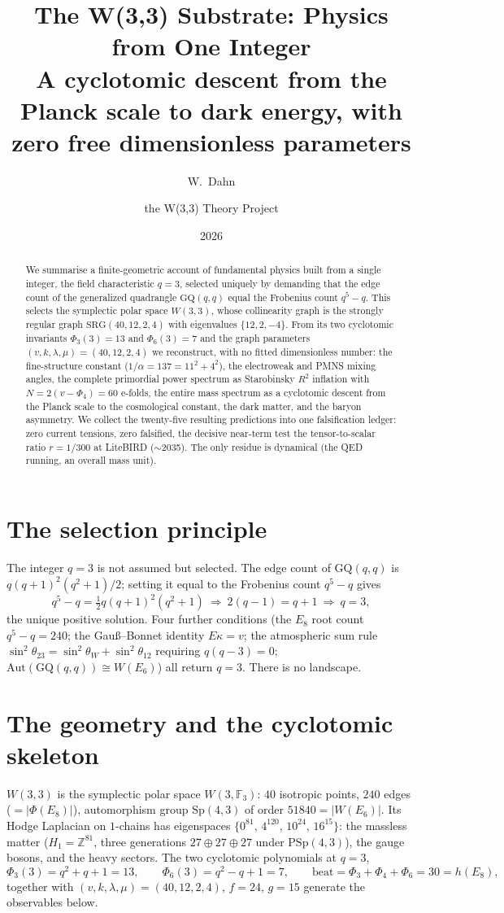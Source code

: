 \documentclass[11pt]{article}
\title{\textbf{The W(3,3) Substrate: Physics from One Integer}\\[4pt]
\large A cyclotomic descent from the Planck scale to dark energy, with zero free dimensionless parameters}
\author{W.\ Dahn \and the W(3,3) Theory Project}
\date{2026}
\begin{document}
\maketitle

\begin{abstract}
We summarise a finite-geometric account of fundamental physics built from a single integer,
the field characteristic $q=3$, selected uniquely by demanding that the edge count of the
generalized quadrangle $\mathrm{GQ}(q,q)$ equal the Frobenius count $q^5-q$. This selects the
symplectic polar space $W(3,3)$, whose collinearity graph is the strongly regular graph
$\mathrm{SRG}(40,12,2,4)$ with eigenvalues $\{12,2,-4\}$. From its two cyclotomic invariants
$\Phi_3(3)=13$ and $\Phi_6(3)=7$ and the graph parameters $(v,k,\lambda,\mu)=(40,12,2,4)$ we
reconstruct, with no fitted dimensionless number: the fine-structure constant
($1/\alpha=137=11^2+4^2$), the electroweak and PMNS mixing angles, the complete primordial
power spectrum as Starobinsky $R^2$ inflation with $N=2(v-\Phi_4)=60$ e-folds, the entire mass
spectrum as a cyclotomic descent from the Planck scale to the cosmological constant, the dark
matter, and the baryon asymmetry. We collect the twenty-five resulting predictions into one
falsification ledger: zero current tensions, zero falsified, the decisive near-term test the
tensor-to-scalar ratio $r=1/300$ at LiteBIRD ($\sim$2035). The only residue is dynamical (the
QED running, an overall mass unit).
\end{abstract}

\section{The selection principle}
The integer $q=3$ is not assumed but selected. The edge count of $\mathrm{GQ}(q,q)$ is
$q(q+1)^2(q^2+1)/2$; setting it equal to the Frobenius count $q^5-q$ gives
\[
q^5-q = \tfrac12 q(q+1)^2(q^2+1)\ \Longrightarrow\ 2(q-1)=q+1\ \Longrightarrow\ q=3,
\]
the unique positive solution. Four further conditions (the $E_8$ root count $q^5-q=240$; the
Gau\ss--Bonnet identity $E\kappa=v$; the atmospheric sum rule $\sin^2\theta_{23}=\sin^2\theta_W
+\sin^2\theta_{12}$ requiring $q(q-3)=0$; $\mathrm{Aut}(\mathrm{GQ}(q,q))\cong W(E_6)$) all
return $q=3$. There is no landscape.

\section{The geometry and the cyclotomic skeleton}
$W(3,3)$ is the symplectic polar space $W(3,\mathbb{F}_3)$: $40$ isotropic points, $240$ edges
($=|\Phi(E_8)|$), automorphism group $\mathrm{Sp}(4,3)$ of order $51840=|W(E_6)|$. Its Hodge
Laplacian on $1$-chains has eigenspaces $\{0^{81},\,4^{120},\,10^{24},\,16^{15}\}$: the
massless matter ($H_1=\mathbb{Z}^{81}$, three generations $27\oplus27\oplus27$ under
$\mathrm{PSp}(4,3)$), the gauge bosons, and the heavy sectors. The two cyclotomic polynomials
at $q=3$,
\[
\Phi_3(3)=q^2+q+1=13,\qquad \Phi_6(3)=q^2-q+1=7,\qquad \mathrm{beat}=\Phi_3+\Phi_4+\Phi_6=30=h(E_8),
\]
together with $(v,k,\lambda,\mu)=(40,12,2,4)$, $f=24$, $g=15$ generate the observables below.
\end{document}
